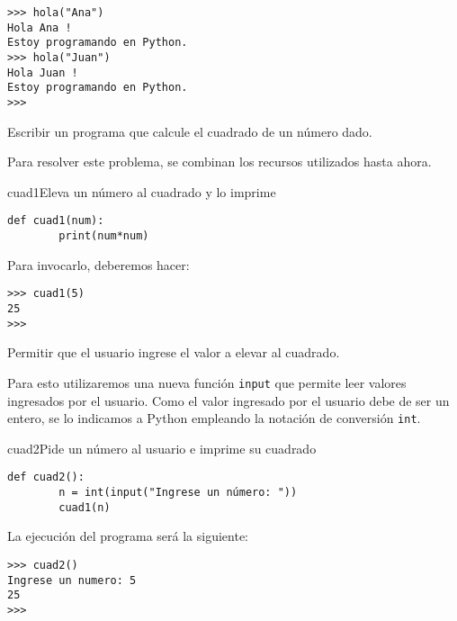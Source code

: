 \begin{lstlisting}[numbers=none]
>>> hola("Ana")
Hola Ana !
Estoy programando en Python.
>>> hola("Juan")
Hola Juan !
Estoy programando en Python.
>>>
\end{lstlisting}

\begin{problema}
\label{cuad1}
Escribir un programa que calcule el cuadrado de un número dado.
\end{problema}

\begin{solucion}
Para resolver este problema, se combinan los recursos utilizados hasta ahora.

\begin{codigo}{cuad1}{Eleva un número al cuadrado y lo imprime}
\begin{lstlisting}[numbers=none]
def cuad1(num):
        print(num*num)
\end{lstlisting}
\end{codigo}

Para invocarlo, deberemos hacer:
\begin{lstlisting}[numbers=none]
>>> cuad1(5)
25
>>>
\end{lstlisting}
\end{solucion}

\begin{problema}
Permitir que el usuario ingrese el valor a elevar al cuadrado.
\end{problema}

\begin{solucion}
Para esto utilizaremos una nueva función \lstinline+input+ que permite leer
valores ingresados por el usuario. Como el valor ingresado por el usuario debe
de ser un entero, se lo indicamos a Python empleando la notación de conversión
\lstinline+int+.

\begin{codigo}{cuad2}{Pide un número al usuario e imprime su cuadrado}
\begin{lstlisting}[numbers=none]
def cuad2():
        n = int(input("Ingrese un número: "))
        cuad1(n)
\end{lstlisting}
\end{codigo}

La ejecución del programa será la siguiente:

\begin{lstlisting}[numbers=none]
>>> cuad2()
Ingrese un numero: 5
25
>>>
\end{lstlisting}
\end{solucion}


